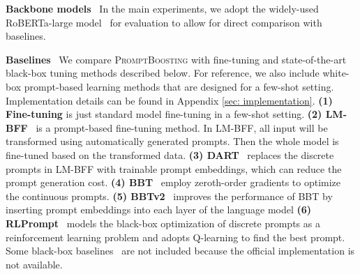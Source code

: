 \documentclass{article}
\theoremstyle{plain}
\theoremstyle{definition}
\theoremstyle{remark}
\newcommand{\alg}{\textsc{PromptBoosting}}
\begin{document}
\noindent \textbf{Backbone models} \ 
In the main experiments, we adopt the widely-used RoBERTa-large model~\citep{liu2019roberta} for evaluation to allow for direct comparison with baselines.

\noindent \textbf{Baselines} \ 
We compare {\alg} with fine-tuning and state-of-the-art black-box tuning methods described below. For reference, we also include white-box prompt-based learning methods that are designed for a few-shot setting. Implementation details can be found in Appendix \ref{sec: implementation}. 
\textbf{(1) Fine-tuning} is just standard model fine-tuning in a few-shot setting.
\textbf{(2) LM-BFF}~\citep{gao2021making} is a prompt-based fine-tuning method. In LM-BFF, all input will be transformed using automatically generated prompts. Then the whole model is fine-tuned based on the transformed data.
\textbf{(3) DART}~\citep{zhang2021differentiable} replaces the discrete prompts in LM-BFF with trainable prompt embeddings, which can reduce the prompt generation cost.
\textbf{(4) BBT}~\citep{sun2022bbt} employ zeroth-order gradients to optimize the continuous prompts.
\textbf{(5) BBTv2}~\citep{sun2022bbtv2} improves the performance of BBT by inserting prompt embeddings into each layer of the language model
\textbf{(6) RLPrompt}~\citep{deng2022rlprompt} models the black-box optimization of discrete prompts as a reinforcement learning problem and adopts Q-learning to find the best prompt.
Some black-box baselines~\citep{zhang2022tempera, chai2022clip} are not included because the official implementation is not available.
\end{document}
